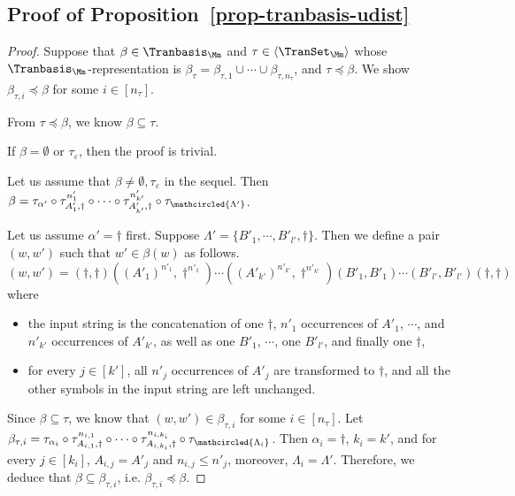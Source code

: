 \subsection*{Proof of Proposition~\ref{prop-tranbasis-udist}}
\begin{proof}

Suppose that $\beta \in \Tranbasis_\Mm$ and $\tau \in \langle \TranSet_\Mm \rangle$ whose $\Tranbasis_\Mm$-representation is $\beta_\tau=\beta_{\tau, 1} \cup \cdots \cup \beta_{\tau, n_\tau}$, and $\tau \preceq \beta$. We show $ \beta_{\tau, i} \preceq \beta$ for some $i \in [n_\tau]$.


From $\tau \preceq \beta$, we know $\beta \subseteq \tau$.

If $\beta = \emptyset$ or $\tau_\varepsilon$, then the proof is trivial. 

Let us assume that $\beta \neq \emptyset, \tau_\varepsilon$ in the sequel.
Then $\beta = \tau_{\alpha'} \circ \tau^{n'_{1}}_{A'_{1}, \dag} \circ \cdots \circ  \tau^{n'_{k'}}_{A'_{ k'}, \dag} \circ \tau_{\mathcircled{\Lambda'}}$.

Let us assume $\alpha' = \dag$ first. Suppose $\Lambda' = \{B'_{1}, \cdots, B'_{ l'}, \dag\}$.  Then we define a pair $(w, w')$ such that $w' \in \beta(w)$ as follows. 
%
$$(w, w') = (\dag, \dag) ((A'_{1})^{n'_{1}}, \dag^{n'_{1}}) \cdots ((A'_{k'})^{n'_{k'}}, \dag^{n'_{k'}}) (B'_{1}, B'_{1}) \cdots (B'_{l'}, B'_{l'}) (\dag, \dag)$$ 
%
where 
\begin{itemize}
\item the input string is the concatenation of one $\dag$, $n'_{1}$ occurrences of $A'_{1}$, $\cdots$, and $n'_{k'}$ occurrences of $A'_{k'}$, as well as one $B'_1$, $\cdots$, one $B'_{l'}$, and finally one $\dag$, 
%
\item for every $j \in [k']$,  all $n'_{j}$ occurrences of $A'_{j}$ are transformed to $\dag$, and all the other symbols in the input string are left unchanged.
\end{itemize}
Since $\beta \subseteq \tau$, we know that $(w, w') \in \beta_{\tau, i}$ for some $i \in [n_\tau]$. 
Let $ \beta_{\tau, i} = \tau_{\alpha_i} \circ \tau^{n_{i,1}}_{A_{i,1}, \dag} \circ \cdots \circ  \tau^{n_{i, k_i}}_{A_{i,k_i}, \dag} \circ \tau_{\mathcircled{\Lambda_i}}$.
Then $\alpha_i = \dag$, $k_i = k'$, and for every $j \in [k_i]$, $A_{i, j} = A'_{j}$ and $n_{i, j} \le n'_{ j}$, moreover, $\Lambda_i = \Lambda'$.
Therefore, we deduce that $\beta \subseteq  \beta_{\tau, i}$, i.e. $\beta_{\tau, i} \preceq \beta$.


\end{proof}
